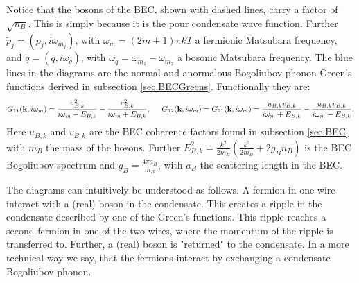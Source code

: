 Notice that the bosons of the BEC, shown with dashed lines, carry a factor of $\sqrt{n_B}$. This is simply because it is the pour condensate wave function. Further $\tilde{p}_j = (p_j, i\omega_{m_j})$, with $\omega_{m} = (2m + 1)\pi kT$ a fermionic Matsubara frequency, and $\tilde{q} = (q, i\omega_q )$, with $\omega_q = \omega_{m_1} - \omega_{m_2}$ a bosonic Matsubara frequency. The blue lines in the diagrams are the normal and anormalous Bogoliubov phonon Green's functions derived in subsection \ref{sec.BECGreens}. Functionally they are:
\begin{equation}
G_{11}(\mathbf{k},i\omega_m) = \frac{u_{B,k}^2}{i\omega_m-E_{B,k}}-\frac{v_{B,k}^2}{i\omega_m+E_{B,k}}, \hspace{0.5cm} G_{12}(\mathbf{k},i\omega_m) = G_{21}(\mathbf{k},i\omega_m) = \frac{u_{B,k}v_{B,k}}{i\omega_m+E_{B,k}}-\frac{u_{B,k}v_{B,k}}{i\omega_m-E_{B,k}}.\nonumber
\end{equation}
Here $u_{B,k}$ and $v_{B,k}$ are the BEC coherence factors found in subsection \ref{sec.BEC} with $m_B$ the mass of the bosons. Further $E^2_{B,k} = \frac{k^2}{2m_B}\left(\frac{k^2}{2m_B} + 2g_Bn_B \right)$ is the BEC Bogoliubov spectrum and $g_B = \frac{4\pi a_B}{m_B}$, with $a_B$ the scattering length in the BEC. 

The diagrams can intuitively be understood as follows. A fermion in one wire interact with a (real) boson in the condensate. This creates a ripple in the condensate described by one of the Green's functions. This ripple reaches a second fermion in one of the two wires, where the momentum of the ripple is transferred to. Further, a (real) boson is "returned" to the condensate. In a more technical way we say, that the fermions interact by exchanging a condensate Bogoliubov phonon. 


